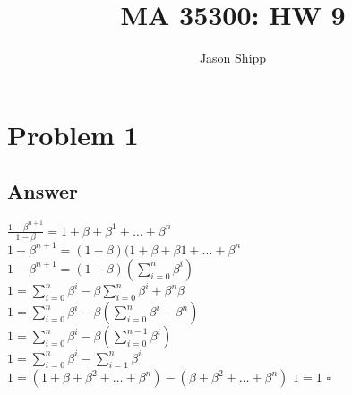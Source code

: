 \documentclass{article}
\newcommand\tab[1][1cm]{\hspace*{#1}}
\begin{document}
\title{MA 35300: HW 9}
\author{Jason Shipp}
\maketitle
\section*{Problem 1}
\subsection*{Answer}
\tab \(\frac{1-\beta^{n+1}}{1-\beta} = 1 + \beta + \beta^{1} + \dots + \beta^{n}\) \\
\tab \(1-\beta^{n+1} = (1-\beta)(1+\beta+\beta{1}+\dots+\beta^{n}\)\\
\tab \(1-\beta^{n+1} = (1-\beta)(\sum\limits_{i=0}^{n}\beta^{i})\) \\
\tab \(1 = \sum\limits_{i=0}^{n}\beta^{i} - \beta\sum\limits_{i=0}^{n}\beta^{i} + \beta^{n}\beta\) \\
\tab \(1 = \sum\limits_{i=0}^{n}\beta^{i} - \beta(\sum\limits_{i=0}^{n}\beta^{i} - \beta^{n})\) \\
\tab \(1 = \sum\limits_{i=0}^{n}\beta^{i} - \beta(\sum\limits_{i=0}^{n-1}\beta^{i})\) \\
\tab \(1 = \sum\limits_{i=0}^{n}\beta^{i} - \sum\limits_{i=1}^{n}\beta^{i}\) \\
\tab \(1 = (1 + \beta + \beta^{2} + \dots + \beta^{n}) - (\beta + \beta^{2} + \dots + \beta^{n})\)
\tab \(1 = 1\) \tab \(\square\)
\end{document}
